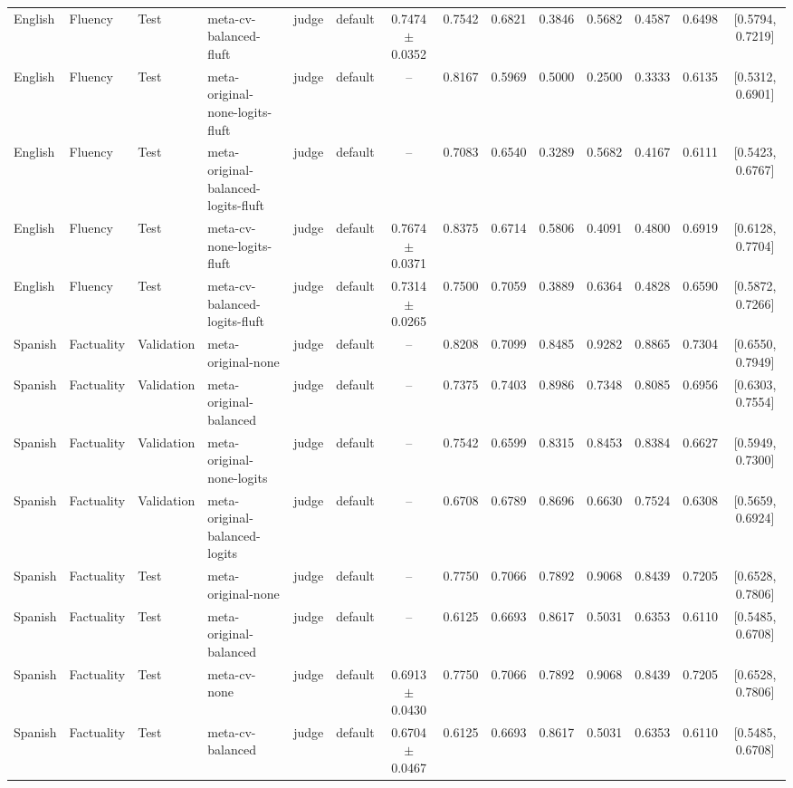 \begin{tabular}{llllllcccccccc}
English & Fluency & Test & meta-cv-balanced-fluft & judge & default & 0.7474 $\pm$ 0.0352 & 0.7542 & 0.6821 & 0.3846 & 0.5682 & 0.4587 & 0.6498 & [0.5794, 0.7219] \\
English & Fluency & Test & meta-original-none-logits-fluft & judge & default & -- & 0.8167 & 0.5969 & 0.5000 & 0.2500 & 0.3333 & 0.6135 & [0.5312, 0.6901] \\
English & Fluency & Test & meta-original-balanced-logits-fluft & judge & default & -- & 0.7083 & 0.6540 & 0.3289 & 0.5682 & 0.4167 & 0.6111 & [0.5423, 0.6767] \\
English & Fluency & Test & meta-cv-none-logits-fluft & judge & default & 0.7674 $\pm$ 0.0371 & 0.8375 & 0.6714 & 0.5806 & 0.4091 & 0.4800 & 0.6919 & [0.6128, 0.7704] \\
English & Fluency & Test & meta-cv-balanced-logits-fluft & judge & default & 0.7314 $\pm$ 0.0265 & 0.7500 & 0.7059 & 0.3889 & 0.6364 & 0.4828 & 0.6590 & [0.5872, 0.7266] \\
Spanish & Factuality & Validation & meta-original-none & judge & default & -- & 0.8208 & 0.7099 & 0.8485 & 0.9282 & 0.8865 & 0.7304 & [0.6550, 0.7949] \\
Spanish & Factuality & Validation & meta-original-balanced & judge & default & -- & 0.7375 & 0.7403 & 0.8986 & 0.7348 & 0.8085 & 0.6956 & [0.6303, 0.7554] \\
Spanish & Factuality & Validation & meta-original-none-logits & judge & default & -- & 0.7542 & 0.6599 & 0.8315 & 0.8453 & 0.8384 & 0.6627 & [0.5949, 0.7300] \\
Spanish & Factuality & Validation & meta-original-balanced-logits & judge & default & -- & 0.6708 & 0.6789 & 0.8696 & 0.6630 & 0.7524 & 0.6308 & [0.5659, 0.6924] \\
Spanish & Factuality & Test & meta-original-none & judge & default & -- & 0.7750 & 0.7066 & 0.7892 & 0.9068 & 0.8439 & 0.7205 & [0.6528, 0.7806] \\
Spanish & Factuality & Test & meta-original-balanced & judge & default & -- & 0.6125 & 0.6693 & 0.8617 & 0.5031 & 0.6353 & 0.6110 & [0.5485, 0.6708] \\
Spanish & Factuality & Test & meta-cv-none & judge & default & 0.6913 $\pm$ 0.0430 & 0.7750 & 0.7066 & 0.7892 & 0.9068 & 0.8439 & 0.7205 & [0.6528, 0.7806] \\
Spanish & Factuality & Test & meta-cv-balanced & judge & default & 0.6704 $\pm$ 0.0467 & 0.6125 & 0.6693 & 0.8617 & 0.5031 & 0.6353 & 0.6110 & [0.5485, 0.6708] \\

\end{tabular}
